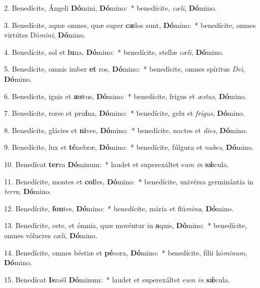 
2. Benedícite, Ángeli \textbf{Dó}mini, \textbf{Dó}mino:~* benedícite, \textit{cæ}\textit{li}, \textbf{Dó}mino.

3. Benedícite, aquæ omnes, quæ super \textbf{cæ}los sunt, \textbf{Dó}mino:~* benedícite, omnes virtútes Dó\textit{mi}\textit{ni}, \textbf{Dó}mino.

4. Benedícite, sol et \textbf{lu}na, \textbf{Dó}mino:~* benedícite, stellæ \textit{cæ}\textit{li}, \textbf{Dó}mino.

5. Benedícite, omnis imber \textbf{et} ros, \textbf{Dó}mino:~* benedícite, omnes spíritus \textit{De}\textit{i}, \textbf{Dó}mino.

6. Benedícite, ignis et \textbf{æs}tus, \textbf{Dó}mino:~* benedícite, frigus et \textit{æs}\textit{tus}, \textbf{Dó}mino.

7. Benedícite, rores et pru\textbf{í}na, \textbf{Dó}mino:~* benedícite, gelu et \textit{fri}\textit{gus}, \textbf{Dó}mino.

8. Benedícite, glácies et \textbf{ni}ves, \textbf{Dó}mino:~* benedícite, noctes et \textit{di}\textit{es}, \textbf{Dó}mino.

9. Benedícite, lux et \textbf{té}nebræ, \textbf{Dó}mino:~* benedícite, fúlgura et \textit{nu}\textit{bes}, \textbf{Dó}mino.

10. Benedícat \textbf{ter}ra \textbf{Dó}minum:~* laudet et superexáltet e\textit{um} \textit{in} \textbf{s\'{\ae}}cula.

11. Benedícite, montes et \textbf{col}les, \textbf{Dó}mino:~* benedícite, univérsa germinántia in \textit{ter}\textit{ra}, \textbf{Dó}mino.

12. Benedícite, \textbf{fon}tes, \textbf{Dó}mino:~* benedícite, mária et flú\textit{mi}\textit{na}, \textbf{Dó}mino.

13. Benedícite, cete, et ómnia, quæ movéntur in \textbf{a}quis, \textbf{Dó}mino:~* benedícite, omnes vólucres \textit{cæ}\textit{li}, \textbf{Dó}mino.

14. Benedícite, omnes béstiæ et \textbf{pé}cora, \textbf{Dó}mino:~* benedícite, fílii hó\textit{mi}\textit{num}, \textbf{Dó}mino.

15. Benedícat \textbf{Is}raël \textbf{Dó}minum:~* laudet et superexáltet e\textit{um} \textit{in} \textbf{s\'{\ae}}cula.

